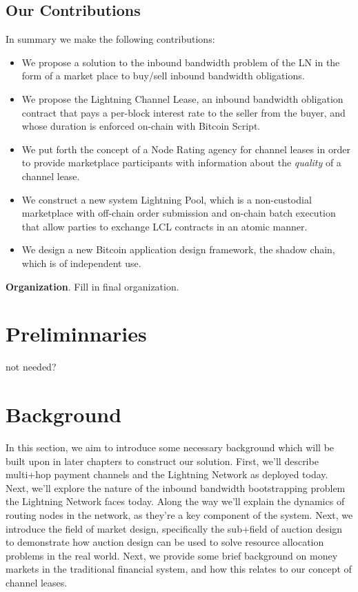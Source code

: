 \documentclass[12pt,a4paper]{article}
\theoremstyle{definition}
\begin{document}
\subsection{Our Contributions}

In summary we make the following contributions: \begin{itemize} \item We
        propose a solution to the inbound bandwidth problem of the LN in the
        form of a market place to buy/sell inbound bandwidth obligations.
    \item We propose the Lightning Channel Lease, an inbound bandwidth
        obligation contract that pays a per-block interest rate to the seller
        from the buyer, and whose duration is enforced on-chain with Bitcoin
        Script.  \item We put forth the concept of a Node Rating agency for
        channel leases in order to provide marketplace participants with
        information about the \emph{quality} of a channel lease.  \item We
        construct a new system Lightning Pool, which is a non-custodial
        marketplace with off-chain order submission and on-chain batch
        execution that allow parties to exchange LCL contracts in an atomic
        manner.  \item We design a new Bitcoin application design framework,
the shadow chain, which is of independent use.  \end{itemize}
 
 
 \textbf{Organization}. Fill in final organization. 
 

\section{Preliminnaries}

not needed? 



\section{Background}

In this section, we aim to introduce some necessary background which will be
built upon in later chapters to construct our solution. First, we'll describe
multi+hop payment channels and the Lightning Network as deployed today. Next,
we'll explore the nature of the inbound bandwidth bootstrapping problem the
Lightning Network faces today. Along the way we'll explain the dynamics of
routing nodes in the network, as they're a key component of the system. Next,
we introduce the field of market design, specifically the sub+field of auction
design to demonstrate how auction design can be used to solve resource
allocation problems in the real world. Next, we provide some brief background
on money markets in the traditional financial system, and how this relates to
our concept of channel leases. 
\end{document}
